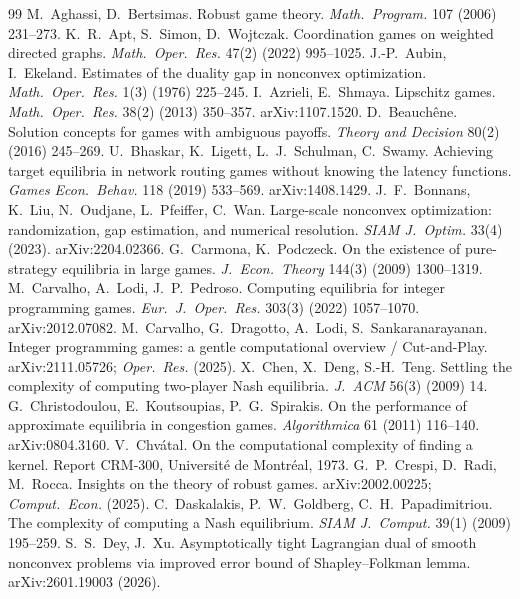 \documentclass[11pt]{article}
\theoremstyle{definition}
\theoremstyle{remark}
\begin{document}
\begin{thebibliography}{99}
 M.~Aghassi, D.~Bertsimas. Robust game theory. \emph{Math.\ Program.} 107 (2006) 231--273.
 K.~R.~Apt, S.~Simon, D.~Wojtczak. Coordination games on weighted directed graphs. \emph{Math.\ Oper.\ Res.} 47(2) (2022) 995--1025.
 J.-P.~Aubin, I.~Ekeland. Estimates of the duality gap in nonconvex optimization. \emph{Math.\ Oper.\ Res.} 1(3) (1976) 225--245.
 I.~Azrieli, E.~Shmaya. Lipschitz games. \emph{Math.\ Oper.\ Res.} 38(2) (2013) 350--357. arXiv:1107.1520.
 D.~Beauchêne. Solution concepts for games with ambiguous payoffs. \emph{Theory and Decision} 80(2) (2016) 245--269.
 U.~Bhaskar, K.~Ligett, L.~J.~Schulman, C.~Swamy. Achieving target equilibria in network routing games without knowing the latency functions. \emph{Games Econ.\ Behav.} 118 (2019) 533--569. arXiv:1408.1429.
 J.~F.~Bonnans, K.~Liu, N.~Oudjane, L.~Pfeiffer, C.~Wan. Large-scale nonconvex optimization: randomization, gap estimation, and numerical resolution. \emph{SIAM J.\ Optim.} 33(4) (2023). arXiv:2204.02366.
 G.~Carmona, K.~Podczeck. On the existence of pure-strategy equilibria in large games. \emph{J.\ Econ.\ Theory} 144(3) (2009) 1300--1319.
 M.~Carvalho, A.~Lodi, J.~P.~Pedroso. Computing equilibria for integer programming games. \emph{Eur.\ J.\ Oper.\ Res.} 303(3) (2022) 1057--1070. arXiv:2012.07082.
 M.~Carvalho, G.~Dragotto, A.~Lodi, S.~Sankaranarayanan. Integer programming games: a gentle computational overview / Cut-and-Play. arXiv:2111.05726; \emph{Oper.\ Res.} (2025).
 X.~Chen, X.~Deng, S.-H.~Teng. Settling the complexity of computing two-player Nash equilibria. \emph{J.\ ACM} 56(3) (2009) 14.
 G.~Christodoulou, E.~Koutsoupias, P.~G.~Spirakis. On the performance of approximate equilibria in congestion games. \emph{Algorithmica} 61 (2011) 116--140. arXiv:0804.3160.
 V.~Chvátal. On the computational complexity of finding a kernel. Report CRM-300, Université de Montréal, 1973.
 G.~P.~Crespi, D.~Radi, M.~Rocca. Insights on the theory of robust games. arXiv:2002.00225; \emph{Comput.\ Econ.} (2025).
 C.~Daskalakis, P.~W.~Goldberg, C.~H.~Papadimitriou. The complexity of computing a Nash equilibrium. \emph{SIAM J.\ Comput.} 39(1) (2009) 195--259.
 S.~S.~Dey, J.~Xu. Asymptotically tight Lagrangian dual of smooth nonconvex problems via improved error bound of Shapley--Folkman lemma. arXiv:2601.19003 (2026).

\end{thebibliography}
\end{document}

